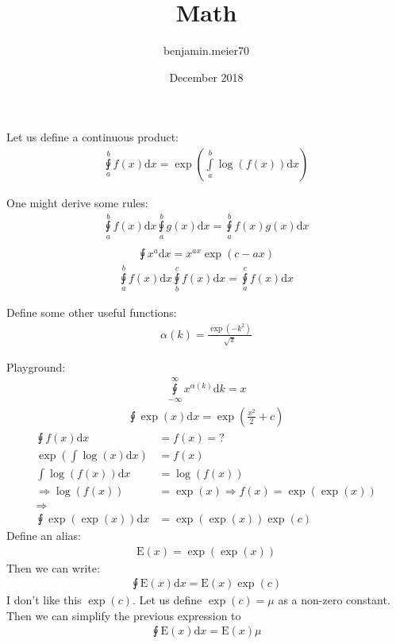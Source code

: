 \documentclass{article}
\title{Math}
\author{benjamin.meier70 }
\date{December 2018}
\begin{document}
\maketitle

Let us define a continuous product:
\begin{align}
    \intcup\limits_a^b f(x) \mathrm{d}x = \exp\left(\int\limits_a^b \log\left(f(x)\right) \mathrm{d}x\right)
\end{align}

One might derive some rules:
\begin{align}
    \intcup\limits_a^b f(x) \mathrm{d}x \intcup\limits_a^b g(x) \mathrm{d}x = \intcup\limits_a^b f(x)g(x) \mathrm{d}x \\
\end{align}
\begin{align}
    \intcup x^a \mathrm{d}x = x^{ax}\exp(c-ax)
\end{align}
\begin{align}
    \intcup\limits_a^b f(x)\mathrm{d}x\intcup\limits_b^c f(x)\mathrm{d}x=\intcup\limits_a^c f(x)\mathrm{d}x
\end{align}

Define some other useful functions:
\begin{align}
    \alpha(k)=\frac{\exp(-k^2)}{\sqrt{\pi}}
\end{align}

Playground:
\begin{align}
    \intcup\limits_{-\infty}^\infty x^{\alpha(k)} \mathrm{d}k=x
\end{align}
\begin{align}
    \intcup \exp(x) \mathrm{d}x=\exp\left(\frac{x^2}{2}+c\right)
\end{align}
\begin{align}
    \intcup f(x) \mathrm{d}x& = f(x) = \mathtt{?} \\
    \exp\left( \int \log(x) \mathrm{d}x\right) &= f(x) \\
    \int \log(f(x))\mathrm{d}x &= \log(f(x)) \\
    \Rightarrow \log(f(x)) &= \exp(x)
    \Rightarrow f(x) = \exp(\exp(x)) \\
    \Rightarrow \\
    \intcup \exp(\exp(x)) \mathrm{d}x &= \exp(\exp(x))\exp(c) 
\end{align}
Define an alias:
\begin{align}
    \mathrm{E}(x)=\exp(\exp(x))
\end{align}
Then we can write:
\begin{align}
    \intcup \mathrm{E}(x) \mathrm{d}x = \mathrm{E}(x)\exp(c)
\end{align}
I don't like this $\exp(c)$. Let us define $\exp(c)=\mu$ as a non-zero constant. Then we can simplify the previous expression to
\begin{align}
    \intcup \mathrm{E}(x) \mathrm{d}x = \mathrm{E}(x)\mu
\end{align}
\end{document}
